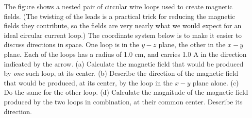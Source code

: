 The figure shows a nested pair of circular wire loops
        used to create magnetic fields. (The twisting of the leads
        is a practical trick for reducing the magnetic fields they
        contribute, so the fields are very nearly what we would
        expect for an ideal circular current loop.) The coordinate
        system below is to make it easier to discuss directions in
        space. One loop is in the $y-z$ plane, the other in the $x-y$
        plane. Each of the loops has a radius of 1.0 cm, and carries
        1.0 A in the direction indicated by the arrow.\hwendpart
        (a) Calculate
        the magnetic field that would be produced by \emph{one} such
        loop, at its center. \answercheck\hwendpart
        (b) Describe the direction of the magnetic field that would
        be produced, at its center, by the loop in the $x-y$ plane alone.\hwendpart
        (c) Do the same for the other loop.\hwendpart
        (d) Calculate the magnitude of the magnetic field produced
        by the two loops in combination, at their common center.
        Describe its direction.\answercheck
